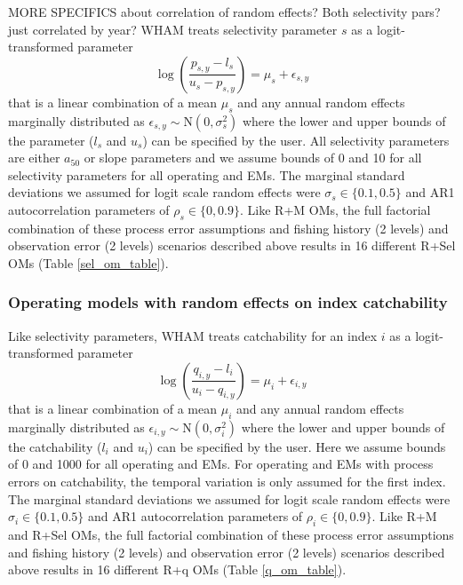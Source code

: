 \documentclass[
  12pt,
]{article}
\begin{document}
MORE SPECIFICS about correlation of random effects? Both selectivity
pars? just correlated by year? WHAM treats selectivity parameter \(s\)
as a logit-transformed parameter \[
\log\left(\frac{p_{s,y}-l_{s}}{u_{s}-p_{s,y}}\right) = \mu_s + \epsilon_{s,y}
\] that is a linear combination of a mean \(\mu_s\) and any annual
random effects marginally distributed as
\(\epsilon_{s,y} \sim \text{N}\left(0,\sigma_s^2\right)\) where the
lower and upper bounds of the parameter (\(l_s\) and \(u_s\)) can be
specified by the user. All selectivity parameters are either \(a_50\) or
slope parameters and we assume bounds of 0 and 10 for all selectivity
parameters for all operating and EMs. The marginal standard deviations
we assumed for logit scale random effects were
\(\sigma_s \in \{0.1, 0.5\}\) and AR1 autocorrelation parameters of
\(\rho_s \in \{0,0.9\}\). Like R+M OMs, the full factorial combination
of these process error assumptions and fishing history (2 levels) and
observation error (2 levels) scenarios described above results in 16
different R+Sel OMs (Table \ref{sel_om_table}).

\hypertarget{operating-models-with-random-effects-on-index-catchability}{%
\subsubsection*{Operating models with random effects on index
catchability}\label{operating-models-with-random-effects-on-index-catchability}}

Like selectivity parameters, WHAM treats catchability for an index \(i\)
as a logit-transformed parameter \[
\log\left(\frac{q_{i,y}-l_{i}}{u_{i}-q_{i,y}}\right) = \mu_i + \epsilon_{i,y}
\] that is a linear combination of a mean \(\mu_i\) and any annual
random effects marginally distributed as
\(\epsilon_{i,y} \sim \text{N}\left(0,\sigma_i^2\right)\) where the
lower and upper bounds of the catchability (\(l_i\) and \(u_i\)) can be
specified by the user. Here we assume bounds of 0 and 1000 for all
operating and EMs. For operating and EMs with process errors on
catchability, the temporal variation is only assumed for the first
index. The marginal standard deviations we assumed for logit scale
random effects were \(\sigma_i \in \{0.1, 0.5\}\) and AR1
autocorrelation parameters of \(\rho_i \in \{0,0.9\}\). Like R+M and
R+Sel OMs, the full factorial combination of these process error
assumptions and fishing history (2 levels) and observation error (2
levels) scenarios described above results in 16 different R+q OMs (Table
\ref{q_om_table}).
\end{document}
